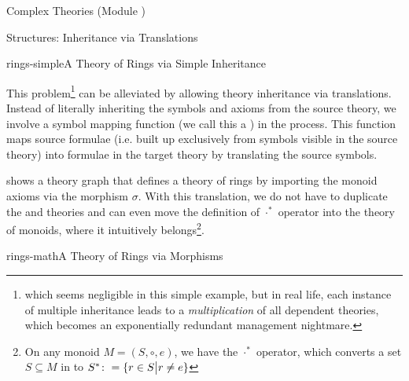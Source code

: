 \begin{tchapter}[id=complex-theories,short=Complex Theories]{Complex Theories (Module
    )}
\begin{tsection}[id=morphisms]{Structures: Inheritance via Translations}
\begin{myfig}{rings-simple}{A Theory of Rings via Simple Inheritance}
{}
\end{myfig}
  
This problem\footnote{which seems negligible in this simple example, but in real life,
  each instance of multiple inheritance leads to a \emph{multiplication} of all
  dependent theories, which becomes an exponentially redundant management nightmare.} can
be alleviated by allowing theory inheritance via translations.  Instead of literally
inheriting the symbols and axioms from the source theory, we involve a symbol mapping
function (we call this a ) in the process. This function maps source
formulae (i.e. built up exclusively from symbols visible in the source theory) into
formulae in the target theory by translating the source symbols.
  
 shows a theory graph that defines a theory of rings by importing
the monoid axioms via the morphism $\sigma$. With this translation, we do not have to
duplicate the  and  theories and can even move the
definition of $\cdot^*$ operator into the theory of monoids, where it intuitively
belongs\footnote{On any monoid $M=(S,\circ,e)$, we have the $\cdot^*$ operator, which
  converts a set $S\subseteq M$ in to $S^*\colon=\{r\in S\bigl|r\ne e\}$}.

\begin{myfig}{rings-math}{A Theory of Rings via Morphisms}
\end{myfig}
\end{tsection}
\end{tchapter}
